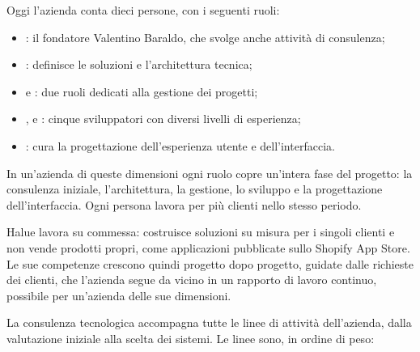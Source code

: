 Oggi l’azienda conta dieci persone, con i seguenti ruoli:

\begin{itemize}
        \item {}: il fondatore
	Valentino Baraldo, che svolge anche attività di consulenza;
        \item {}:
	definisce le soluzioni e l’architettura tecnica;
        \item {} e
	: due ruoli dedicati alla
	gestione dei progetti;
        \item {},
	 e : cinque sviluppatori con diversi livelli di esperienza;
        \item {}: cura la
	progettazione dell’esperienza utente e dell’interfaccia.
\end{itemize}

In un’azienda di queste dimensioni ogni ruolo copre un’intera fase del progetto: la consulenza
iniziale, l’architettura, la gestione, lo sviluppo e la progettazione dell’interfaccia. Ogni
persona lavora per più clienti nello stesso periodo.

Halue lavora su commessa: costruisce soluzioni su misura per i singoli clienti e non vende prodotti
propri, come applicazioni pubblicate sullo Shopify App Store. Le sue competenze crescono quindi
progetto dopo progetto, guidate dalle richieste dei clienti, che l’azienda segue da vicino in un
rapporto di lavoro continuo, possibile per un’azienda delle sue dimensioni.

La consulenza tecnologica accompagna tutte le linee di attività dell’azienda, dalla valutazione
iniziale alla scelta dei sistemi. Le linee sono, in ordine di peso:

